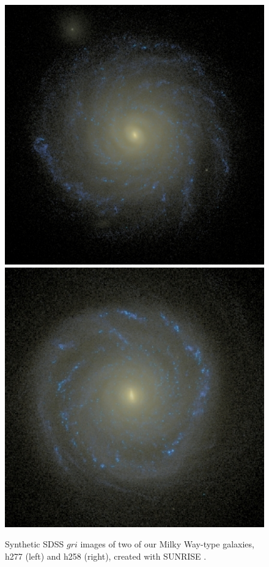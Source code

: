 \documentclass[nofootinbib,twocolumn,prd]{emulateapj}
\begin{document}
\begin{figure}
\includegraphics[width=\columnwidth]{Figures/boring}
\includegraphics[width=\columnwidth]{Figures/exciting}
\caption{\label{fig:GalaxyImages}Synthetic SDSS $gri$ images of two of our Milky Way-type galaxies, h277 (left) and h258 (right), created with \textsc{SUNRISE} \citep{Jonsson06}.
\label{fig:images}
}
\end{figure}
\end{document}
